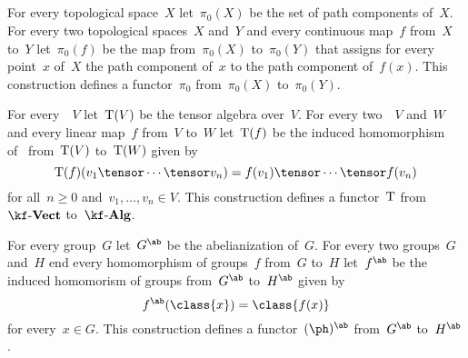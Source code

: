 \subsection{}

For every topological space~$X$ let~$\pi_0(X)$ be the set of path components of~$X$.
For every two topological spaces~$X$ and~$Y$ and every continuous map~$f$ from~$X$ to~$Y$ let~$\pi_0(f)$ be the map from~$\pi_0(X)$ to~$\pi_0(Y)$ that assigns for every point~$x$ of~$X$ the path component of~$x$ to the path component of~$f(x)$.
This construction defines a functor~$\pi_0$ from~$\pi_0(X)$ to~$\pi_0(Y)$.

For every~\vectorspace{$\kf$}~$V$ let~$\operatorname{T}(V)$ be the tensor algebra over~$V$.
For every two~\vectorspaces{$\kf$}~$V$ and~$W$ and every linear map~$f$ from~$V$ to~$W$ let~$\operatorname{T}(f)$ be the induced homomorphism of~\algebras{$\kf$} from~$\operatorname{T}(V)$ to~$\operatorname{T}(W)$ given by
\[
	\Tensor(f)( v_1 \tensor \dotsb \tensor v_n )
	=
	f(v_1) \tensor \dotsb \tensor f(v_n)
\]
for all~$n \geq 0$ and~$v_1, \dotsc, v_n \in V$.
This construction defines a functor~$\operatorname{T}$ from~$\Vect{\kf}$ to~$\Alg{\kf}$.

For every group~$G$ let~$G^{\ab}$ be the abelianization of~$G$.
For every two groups~$G$ and~$H$ end every homomorphism of groups~$f$ from~$G$ to~$H$ let~$f^{\ab}$ be the induced homomorism of groups from~$G^{\ab}$ to~$H^{\ab}$ given by
\[
	f^{\ab}( \class{x} )
	=
	\class{ f(x) }
\]
for every~$x \in G$.
This construction defines a functor~$(\ph)^{\ab}$ from~$G^{\ab}$ to~$H^{\ab}$.
